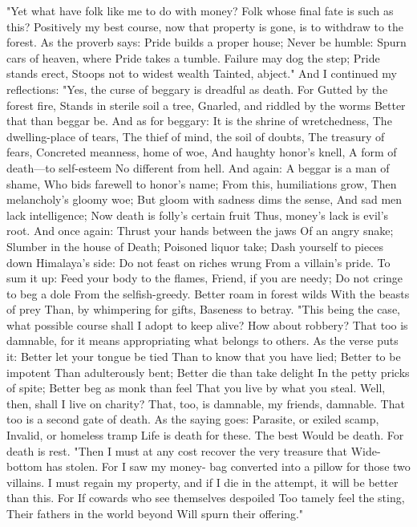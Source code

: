 \documentclass{book}
\begin{document}
"Yet what have folk like me to do with money?
Folk whose final fate is such as this? Positively my
best course, now that property is gone, is to withdraw
to the forest. As the proverb says:
Pride builds a proper house;
Never be humble:
Spurn cars of heaven, where
Pride takes a tumble.
Failure may dog the step;
Pride stands erect,
Stoops not to widest wealth
Tainted, abject."
And I continued my reflections: "Yes, the curse of
beggary is dreadful as death. For
Gutted by the forest fire,
Stands in sterile soil a tree,
Gnarled, and riddled by the worms
Better that than beggar be.
And as for beggary:
It is the shrine of wretchedness,
The dwelling-place of tears,
The thief of mind, the soil of doubts,
The treasury of fears,
Concreted meanness, home of woe,
And haughty honor's knell,
A form of death---to self-esteem
No different from hell.
And again:
A beggar is a man of shame,
Who bids farewell to honor's name;
From this, humiliations grow,
Then melancholy's gloomy woe;
But gloom with sadness dims the sense,
And sad men lack intelligence;
Now death is folly's certain fruit
Thus, money's lack is evil's root.
And once again:
Thrust your hands between the jaws
Of an angry snake;
Slumber in the house of Death;
Poisoned liquor take;
Dash yourself to pieces down
Himalaya's side:
Do not feast on riches wrung
From a villain's pride.
To sum it up:
Feed your body to the flames,
Friend, if you are needy;
Do not cringe to beg a dole
From the selfish-greedy.
Better roam in forest wilds
With the beasts of prey
Than, by whimpering for gifts,
Baseness to betray.
"This being the case, what possible course shall I
adopt to keep alive? How about robbery? That too
is damnable, for it means appropriating what belongs
to others. As the verse puts it:
Better let your tongue be tied
Than to know that you have lied;
Better to be impotent
Than adulterously bent;
Better die than take delight
In the petty pricks of spite;
Better beg as monk than feel
That you live by what you steal.
Well, then, shall I live on charity? That, too, is
damnable, my friends, damnable. That too is a
second gate of death. As the saying goes:
Parasite, or exiled scamp,
Invalid, or homeless tramp
Life is death for these. The best
Would be death. For death is rest.
"Then I must at any cost recover the very treasure
that Wide-bottom has stolen. For I saw my money-
bag converted into a pillow for those two villains. I
must regain my property, and if I die in the attempt,
it will be better than this. For
If cowards who see themselves despoiled
Too tamely feel the sting,
Their fathers in the world beyond
Will spurn their offering."
\end{document}
